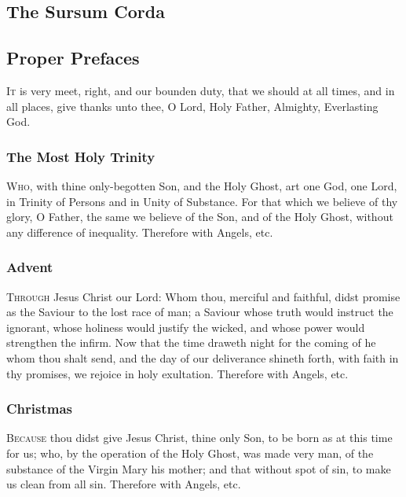 \subsection{The Sursum Corda}
\subsection{Proper Prefaces}\label{prefaces}
\noindent
\textsc{It} is very meet, right, and our bounden duty, that we should at all times, and in all places, give thanks unto thee, O Lord, Holy Father, Almighty, Everlasting God.
\subsubsection{The Most Holy Trinity}
\textsc{Who,} with thine only-begotten Son, and the Holy Ghost, art one God, one Lord, in Trinity of Persons and in Unity of Substance. For that which we believe of thy glory, O Father, the same we believe of the Son, and of the Holy Ghost, without any difference of inequality.
    Therefore with Angels, etc.
\subsubsection{Advent}
\textsc{Through} Jesus Christ our Lord: Whom thou, merciful and faithful, didst promise as the Saviour to the lost race of man; a Saviour whose truth would instruct the ignorant, whose holiness would justify the wicked, and whose power would strengthen the infirm. Now that the time draweth night for the coming of he whom thou shalt send, and the day of our deliverance shineth forth, with faith in thy promises, we rejoice in holy exultation. Therefore with Angels, etc.
\subsubsection{Christmas}
\textsc{Because} thou didst give Jesus Christ, thine only Son, to be born as at this time for us; who, by the operation of the Holy Ghost, was made very man, of the substance of the Virgin Mary his mother; and that without spot of sin, to make us clean from all sin. Therefore with Angels, etc.
